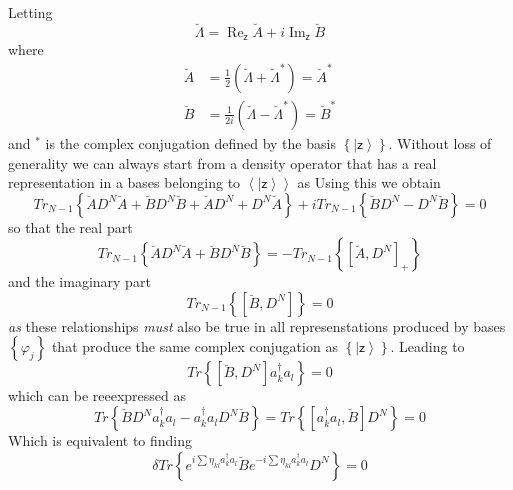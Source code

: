 \documentclass[aps,preprint]{revtex4}%
\begin{document}
Letting
\begin{equation}
\breve{\Lambda}=\operatorname{Re}_{\mathsf{z}}\breve{A}+i\operatorname{Im}%
_{\mathsf{z}}\breve{B}%
\end{equation}
where
\begin{align}
\breve{A} &  =\frac{1}{2}\left(  \breve{\Lambda}+\breve{\Lambda}^{\ast
}\right)  =\breve{A}^{\ast}\nonumber\\
\breve{B} &  =\frac{1}{2i}\left(  \breve{\Lambda}-\breve{\Lambda}^{\ast
}\right)  =\breve{B}^{\ast}%
\end{align}
and $^{\ast}$ is the complex conjugation defined by the basis $\left\{
\left\vert \mathsf{z}\right\rangle \right\}  .$ Without loss of generality we
can always start from a density operator that has a real representation in a
bases belonging to $\left\langle \left\vert \mathsf{z}\right\rangle
\right\rangle $ as  Using this we obtain%
\begin{equation}
Tr_{N-1}\left\{  \breve{A}D^{N}\breve{A}+\breve{B}D^{N}\breve{B}+\breve
{A}D^{N}+D^{N}\breve{A}\right\}  +iTr_{N-1}\left\{  \breve{B}D^{N}-D^{N}%
\breve{B}\right\}  =0
\end{equation}
so that the real part
\begin{equation}
Tr_{N-1}\left\{  \breve{A}D^{N}\breve{A}+\breve{B}D^{N}\breve{B}\right\}
=-Tr_{N-1}\left\{  \left[  \breve{A},D^{N}\right]  _{+}\right\}
\end{equation}
and the imaginary part
\begin{equation}
Tr_{N-1}\left\{  \left[  \breve{B},D^{N}\right]  \right\}  =0
\end{equation}
\emph{as }these relationships \emph{must} also be true in all represenstations
produced by bases $\left\{  \varphi_{j}\right\}  $ that produce the same
complex conjugation as $\left\{  \left\vert \mathsf{z}\right\rangle \right\}
.$  Leading to
\begin{equation}
Tr\left\{  \left[  \breve{B},D^{N}\right]  a_{k}^{\dagger}a_{l}\right\}  =0
\end{equation}
which can be reeexpressed as
\begin{equation}
Tr\left\{  \breve{B}D^{N}a_{k}^{\dagger}a_{l}-a_{k}^{\dagger}a_{l}D^{N}%
\breve{B}\right\}  =Tr\left\{  \left[  a_{k}^{\dagger}a_{l},\breve{B}\right]
D^{N}\right\}  =0\label{con1}%
\end{equation}
Which is equivalent to finding
\begin{equation}
\delta Tr\left\{  e^{i%
{\textstyle\sum}
\eta_{kl}a_{k}^{\dagger}a_{l}}\breve{B}e^{-i%
{\textstyle\sum}
\eta_{kl}a_{k}^{\dagger}a_{l}}D^{N}\right\}  =0
\end{equation}
\end{document}
